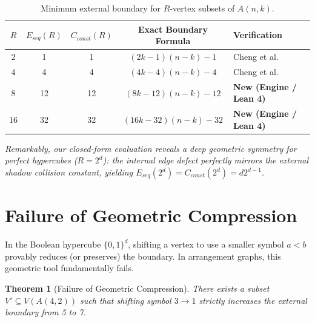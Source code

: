 \documentclass[11pt, letterpaper]{article}
\newtheorem{theorem}{Theorem}[section]
\theoremstyle{definition}
\theoremstyle{remark}
\begin{document}
\begin{table}[ht]
\centering
\caption{Minimum external boundary for $R$-vertex subsets of $A(n,k)$.}
\label{tab:engine}
\begin{tabular}{@{}ccccl@{}}
\toprule
$R$ & $E_{seq}(R)$ & $C_{const}(R)$ & Exact Boundary Formula & Verification \\
\midrule
2  & 1  & 1  & $(2k-1)(n-k)-1$    & Cheng et al. \cite{cheng2022extraconnectivity} \\
4  & 4  & 4  & $(4k-4)(n-k)-4$    & Cheng et al. \cite{cheng2022extraconnectivity} \\
8  & 12 & 12 & $(8k-12)(n-k)-12$  & \textbf{New (Engine / Lean 4)} \\
16 & 32 & 32 & $(16k-32)(n-k)-32$ & \textbf{New (Engine / Lean 4)} \\
\bottomrule
\end{tabular}
\end{table}

\noindent \small \textit{Remarkably, our closed-form evaluation reveals a deep geometric symmetry for perfect hypercubes ($R=2^d$): the internal edge defect perfectly mirrors the external shadow collision constant, yielding $E_{seq}(2^d) = C_{const}(2^d) = d 2^{d-1}$.}

\section{Failure of Geometric Compression}

In the Boolean hypercube $\{0,1\}^d$, shifting a vertex to use a smaller symbol $a < b$ provably reduces (or preserves) the boundary. In arrangement graphs, this geometric tool fundamentally fails.

\begin{theorem}[Failure of Geometric Compression]\label{them:nogo}
There exists a subset $V' \subseteq V(A(4,2))$ such that shifting symbol $3 \to 1$ strictly \emph{increases} the external boundary from 5 to 7.
\end{theorem}
\end{document}
